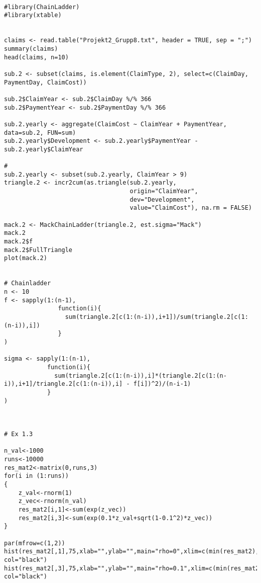 \documentclass[a4paper]{article}
\begin{document}
\begin{verbatim}

#library(ChainLadder)
#library(xtable)


claims <- read.table("Projekt2_Grupp8.txt", header = TRUE, sep = ";")
summary(claims)
head(claims, n=10)

sub.2 <- subset(claims, is.element(ClaimType, 2), select=c(ClaimDay, PaymentDay, ClaimCost))

sub.2$ClaimYear <- sub.2$ClaimDay %/% 366
sub.2$PaymentYear <- sub.2$PaymentDay %/% 366

sub.2.yearly <- aggregate(ClaimCost ~ ClaimYear + PaymentYear, data=sub.2, FUN=sum)
sub.2.yearly$Development <- sub.2.yearly$PaymentYear - sub.2.yearly$ClaimYear

#
sub.2.yearly <- subset(sub.2.yearly, ClaimYear > 9)
triangle.2 <- incr2cum(as.triangle(sub.2.yearly,
                                   origin="ClaimYear",
                                   dev="Development",
                                   value="ClaimCost"), na.rm = FALSE)

mack.2 <- MackChainLadder(triangle.2, est.sigma="Mack")
mack.2
mack.2$f
mack.2$FullTriangle
plot(mack.2)


# Chainladder
n <- 10
f <- sapply(1:(n-1),
               function(i){
                 sum(triangle.2[c(1:(n-i)),i+1])/sum(triangle.2[c(1:(n-i)),i])
               }
)

sigma <- sapply(1:(n-1),
            function(i){
              sum(triangle.2[c(1:(n-i)),i]*(triangle.2[c(1:(n-i)),i+1]/triangle.2[c(1:(n-i)),i] - f[i])^2)/(n-i-1)
            }
)



# Ex 1.3

n_val<-1000
runs<-10000
res_mat2<-matrix(0,runs,3)
for(i in (1:runs))
{
	z_val<-rnorm(1)
	z_vec<-rnorm(n_val)
	res_mat2[i,1]<-sum(exp(z_vec))
	res_mat2[i,3]<-sum(exp(0.1*z_val+sqrt(1-0.1^2)*z_vec))
}

par(mfrow=c(1,2))
hist(res_mat2[,1],75,xlab="",ylab="",main="rho=0",xlim=c(min(res_mat2),max(res_mat2)),
col="black")
hist(res_mat2[,3],75,xlab="",ylab="",main="rho=0.1",xlim=c(min(res_mat2),max(res_mat2)),
col="black")
\end{verbatim}
\end{document}
